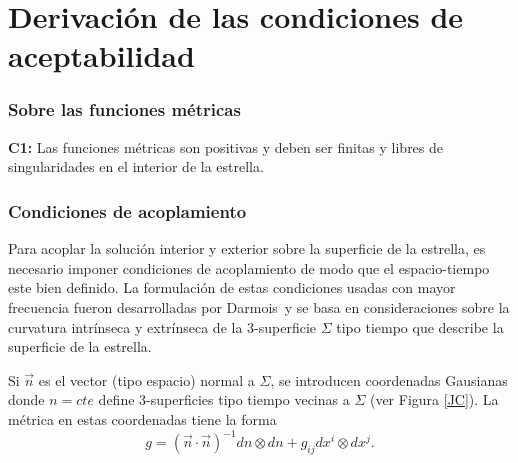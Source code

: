 \chapter{Derivación de las condiciones de aceptabilidad}\label{AceppCon}

\subsection*{Sobre las funciones métricas}
\textbf{C1:} Las funciones métricas son positivas y deben ser finitas y libres de singularidades en el interior de la estrella.
\subsection*{Condiciones de acoplamiento}
 Para acoplar la solución interior y exterior sobre la superficie de la estrella, es necesario imponer condiciones de acoplamiento de modo que el espacio-tiempo este bien definido. 
 La formulación de estas condiciones usadas con mayor frecuencia fueron desarrolladas por Darmois\, y se basa en consideraciones sobre la curvatura intrínseca y extrínseca de la 3-superficie $\Sigma$ tipo tiempo que describe la superficie de la estrella.
 
 Si $\vec{n}$ es el vector (tipo espacio) normal a $\Sigma$, se introducen coordenadas Gausianas donde $n=cte$ define 3-superficies tipo tiempo vecinas a $\Sigma$ (ver Figura \ref{JC}). La métrica en estas coordenadas tiene la forma 
 \begin{equation}
g=(\vec{n} \cdot \vec{n})^{-1} d n\otimes d n +g_{i j} d x^{i} \otimes d x^{j}. 
\end{equation}


